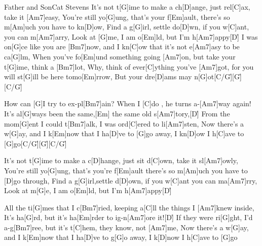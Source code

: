 \documentclass[../main.tex]{subfiles}
\begin{document}
\begin{song}{Father and Son}{Cat Stevens}{}
It's not t[G]ime to make a ch[D]ange, just rel[C]ax, take it [Am7]easy,
You're still yo[G]ung, that's your f[Em]ault, there's so m[Am]uch you have to kn[D]ow,
Find a g[G]irl, settle do[D]wn, if you w[C]ant, you can m[Am7]arry,
Look at [G]me, I am o[Em]ld, but I'm h[Am7]appy[D]{\h}
I was on[G]ce like you are [Bm7]now, and I kn[C]ow that it's not e[Am7]asy to be ca[G]lm,
When you've fo[Em]und something going [Am7]on, \hh [D]but take your t[G]ime, think a [Bm7]lot,
Why, think of ever[C]ything you've [Am7]got, for you will st[G]ill be here tomo[Em]rrow,
But your dre[D]ams may n[G]ot[C/G]{\h}[G]{\h}[C/G]{\h}

How can [G]I try to ex-pl[Bm7]ain? When I [C]do , he turns a-[Am7]way again!
It's al[G]ways been the same,[Em]   the same old s[Am7]tory,[D]{\h}
From the mom[G]ent I could t[Bm7]alk, I was ord[C]ered to li[Am7]sten,
Now there's a w[G]ay, and I k[Em]now that I ha[D]ve to [G]go away,
I kn[D]ow I h[C]ave to [G]go[C/G]{\h}[G]{\h}[C/G]{\h}

It's not t[G]ime to make a c[D]hange, just sit d[C]own, take it sl[Am7]owly,
You're still yo[G]ung, that's you're f[Em]ault there's so m[Am]uch
you have to [D]go through, Find a g[G]irl,settle d[D]own, if you w[C]ant you can ma[Am7]rry,
Look at m[G]e, I am o[Em]ld, but I'm h[Am7]appy[D]{\h}

All the ti[G]mes that I c[Bm7]ried, keeping a[C]ll the things I [Am7]knew inside,
It's ha[G]rd, but it's ha[Em]rder to ig-n[Am7]ore it![D]{\h}
If they were ri[G]ght, I'd a-g[Bm7]ree, but it's t[C]hem, they know, not [Am7]me,
Now there's a w[G]ay, and I k[Em]now that I ha[D]ve to g[G]o away, I k[D]now I h[C]ave to [G]go
\end{song}
\end{document}
